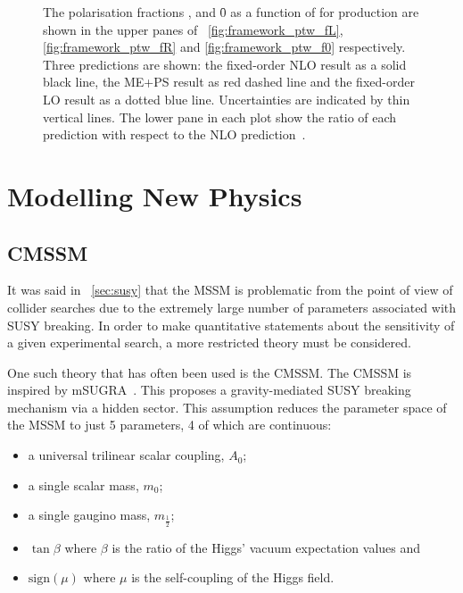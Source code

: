 \begin{figure}[h!]
\centering
{}
\caption{The polarisation fractions \fL, \fR and \f0 as a function of \PtW for
  \PWp production are shown in the upper panes of
  \figs~\ref{fig:framework_ptw_fL}, \ref{fig:framework_ptw_fR} and
  \ref{fig:framework_ptw_f0} respectively. Three predictions are shown: the
  fixed-order \ac{NLO} result as a solid black line, the \ac{ME+PS} result as
  red dashed line and the fixed-order \ac{LO} result as a dotted blue
  line. Uncertainties are indicated by thin vertical lines. The lower pane in
  each plot show the ratio of each prediction with respect to the \ac{NLO}
  prediction~\cite{berger_left_handed_w}.}
\label{fig:framework_ptw}
\end{figure}

\section{Modelling New Physics}
\label{sec:framework_susy}
\subsection{\acl{CMSSM}}
\label{sec:cmssm}
It was said in \chap~\ref{sec:susy} that the \ac{MSSM} is problematic from the
point of view of collider searches due to the extremely large number of
parameters associated with \ac{SUSY} breaking. In order to make quantitative
statements about the sensitivity of a given experimental search, a more
restricted theory must be considered.

One such theory that has often been used is the \ac{CMSSM}. The \ac{CMSSM} is
inspired by \ac{mSUGRA}~\cite{kane_minimal}. This proposes a
gravity-mediated \ac{SUSY} breaking mechanism via a hidden sector. This
assumption reduces the parameter space of the \ac{MSSM} to just 5 parameters, 4
of which are continuous:
\begin{itemize}
\item a universal trilinear scalar coupling, $A_0$;
\item a single scalar mass, $m_0$;
\item a single gaugino mass, $m_{\frac{1}{2}}$;
\item $\tan\beta$ where $\beta$ is the ratio of the Higgs' vacuum expectation values and
\item $\textrm{sign}(\mu)$ where $\mu$ is the self-coupling of the Higgs field.
\end{itemize}

